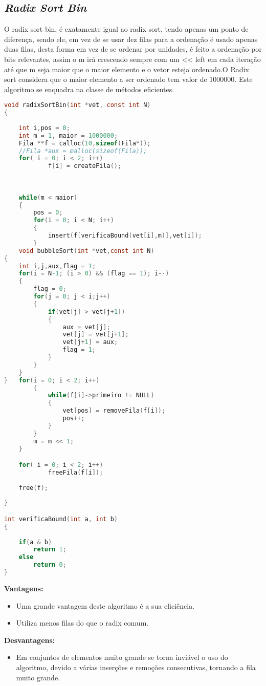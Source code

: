 \documentclass[
	12pt,				%
	oneside,			%
	a4paper,			%
	english,			%
	brazil,				%
	]{article}
\begin{document}
\subsection{\textit{Radix Sort Bin}}
O radix sort bin, é exatamente igual ao radix sort, tendo apenas um ponto de diferença, sendo ele, em vez de se usar dez filas para a ordenação é usado apenas
duas filas, desta forma em vez de se ordenar por unidades, é feito a ordenação por bits relevantes, assim o m irá crescendo sempre com um << left em cada iteração 
até que m seja maior que o maior elemento e o vetor esteja ordenado.O Radix sort considera que o maior elemento a ser ordenado tem valor de 1000000. Este algoritmo se enquadra na classe de métodos eficientes.
\begin{lstlisting}[language=C, caption=Estrutura \textit{RadixBin}]
void radixSortBin(int *vet, const int N)
{
	
	int i,pos = 0;
	int m = 1, maior = 1000000;
	Fila **f = calloc(10,sizeof(Fila*));
	//Fila *aux = malloc(sizeof(Fila));
	for( i = 0; i < 2; i++)
			f[i] = createFila();

	
	
	while(m < maior)
	{
		pos = 0;
		for(i = 0; i < N; i++)
		{
			insert(f[verificaBound(vet[i],m)],vet[i]); 
		}
	void bubbleSort(int *vet,const int N)
{
	int i,j,aux,flag = 1;
	for(i = N-1; (i > 0) && (flag == 1); i--)
	{
		flag = 0;
		for(j = 0; j < i;j++)
		{
			if(vet[j] > vet[j+1])
			{
				aux = vet[j];
				vet[j] = vet[j+1];
				vet[j+1] = aux;
				flag = 1;
			}
		}
	}
}	for(i = 0; i < 2; i++)
		{
			while(f[i]->primeiro != NULL)
			{
				vet[pos] = removeFila(f[i]);
				pos++;
			}
		}
		m = m << 1;
	}	

	for( i = 0; i < 2; i++)	
			freeFila(f[i]);
	
	free(f);
	
}

int verificaBound(int a, int b)
{
	
	if(a & b)
		return 1;
	else
		return 0;
}
\end{lstlisting}
\textbf{Vantagens:}
\begin{itemize}
 \item Uma grande vantagem deste algoritmo é a sua eficiência.
 \item Utiliza menos filas do que o radix comum.
\end{itemize}
\textbf{Desvantagens:}
\begin{itemize}
 \item Em conjuntos de elementos muito grande se torna inviável o uso do algoritmo, devido a várias inserções e remoções consecutivas, tornando a fila muito grande.
\end{itemize}
\end{document}
